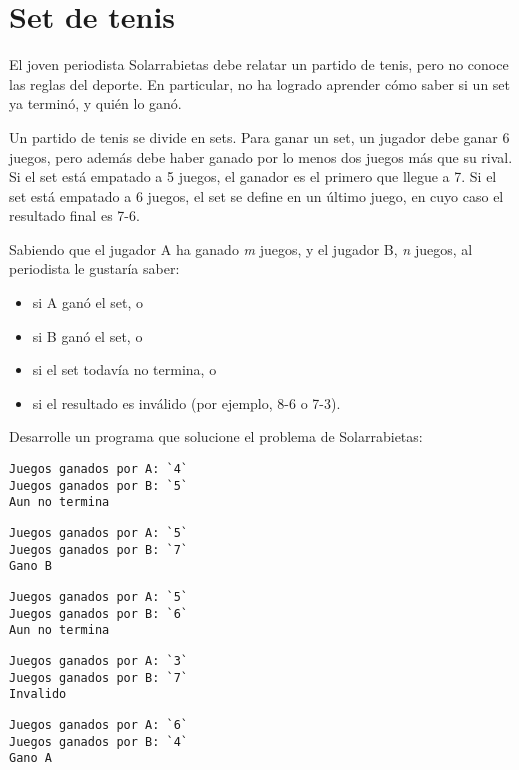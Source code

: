 \section{Set de tenis}

El joven periodista Solarrabietas debe relatar un partido de tenis, pero
no conoce las reglas del deporte. En particular, no ha logrado aprender
cómo saber si un set ya terminó, y quién lo ganó.

Un partido de tenis se divide en sets. Para ganar un set, un jugador
debe ganar 6 juegos, pero además debe haber ganado por lo menos dos
juegos más que su rival. Si el set está empatado a 5 juegos, el ganador
es el primero que llegue a 7. Si el set está empatado a 6 juegos, el set
se define en un último juego, en cuyo caso el resultado final es 7-6.

Sabiendo que el jugador A ha ganado \emph{m} juegos, y el jugador B,
\emph{n} juegos, al periodista le gustaría saber:

\begin{itemize}
\item
  si A ganó el set, o
\item
  si B ganó el set, o
\item
  si el set todavía no termina, o
\item
  si el resultado es inválido (por ejemplo, 8-6 o 7-3).
\end{itemize}

Desarrolle un programa que solucione el problema de Solarrabietas:

\begin{lstlisting}[language=testcase]
Juegos ganados por A: `4`
Juegos ganados por B: `5`
Aun no termina
\end{lstlisting}

\begin{lstlisting}[language=testcase]
Juegos ganados por A: `5`
Juegos ganados por B: `7`
Gano B
\end{lstlisting}

\begin{lstlisting}[language=testcase]
Juegos ganados por A: `5`
Juegos ganados por B: `6`
Aun no termina
\end{lstlisting}

\begin{lstlisting}[language=testcase]
Juegos ganados por A: `3`
Juegos ganados por B: `7`
Invalido
\end{lstlisting}

\begin{lstlisting}[language=testcase]
Juegos ganados por A: `6`
Juegos ganados por B: `4`
Gano A
\end{lstlisting}

